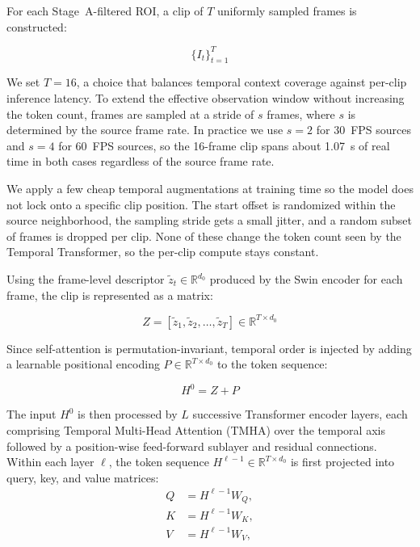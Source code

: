 \documentclass[conference]{IEEEtran}
\begin{document}
For each Stage~A-filtered ROI, a clip of $T$ uniformly sampled frames is constructed:

\begin{equation}
\{I_t\}_{t=1}^{T}
\label{eq:clip_frames}
\end{equation}

\noindent We set $T = 16$, a choice that balances temporal context coverage against per-clip inference latency. To extend the effective observation window without increasing the token count, frames are sampled at a stride of $s$ frames, where $s$ is determined by the source frame rate. In practice we use $s=2$ for 30~FPS sources and $s=4$ for 60~FPS sources, so the 16-frame clip spans about 1.07~s of real time in both cases regardless of the source frame rate.

We apply a few cheap temporal augmentations at training time so the model does not lock onto a specific clip position. The start offset is randomized within the source neighborhood, the sampling stride gets a small jitter, and a random subset of frames is dropped per clip. None of these change the token count seen by the Temporal Transformer, so the per-clip compute stays constant.

Using the frame-level descriptor $\tilde{z}_t \in \mathbb{R}^{d_0}$ produced by the Swin encoder for each frame, the clip is represented as a matrix:

\begin{equation}
Z = [\tilde{z}_1, \tilde{z}_2, \ldots, \tilde{z}_T] \in \mathbb{R}^{T \times d_0}
\label{eq:clip_matrix}
\end{equation}

\noindent Since self-attention is permutation-invariant, temporal order is injected by adding a learnable positional encoding $P \in \mathbb{R}^{T \times d_0}$ to the token sequence:

\begin{equation}
H^0 = Z + P
\label{eq:positional_encoding}
\end{equation}

\noindent The input $H^0$ is then processed by $L$ successive Transformer encoder layers, each comprising Temporal Multi-Head Attention (TMHA) over the temporal axis followed by a position-wise feed-forward sublayer and residual connections. Within each layer $\ell$, the token sequence $H^{\ell-1} \in \mathbb{R}^{T \times d_0}$ is first projected into query, key, and value matrices:
\begin{align}
Q &= H^{\ell-1}W_Q, \label{eq:proj_q} \\
K &= H^{\ell-1}W_K, \label{eq:proj_k} \\
V &= H^{\ell-1}W_V, \label{eq:proj_v}
\end{align}
\end{document}
